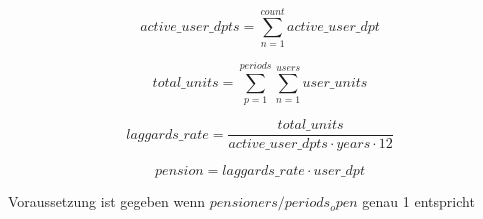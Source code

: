 \begin{equation*}
	active\_user\_dpts = 
	\sum_{n=1}^{count} active\_user\_dpt
\end{equation*}

\begin{equation*}
	total\_units = 	
	\sum_{p=1}^{periods} \sum_{n=1}^{users} user\_units	
\end{equation*}

\begin{equation*}
	laggards\_rate = 	
	\frac{total\_units} 
	{active\_user\_dpts \cdot years \cdot 12}		
\end{equation*}

\begin{equation*}
	pension = laggards\_rate \cdot user\_dpt
\end{equation*}


Voraussetzung ist gegeben wenn $pensioners / periods_open$ genau 1 entspricht